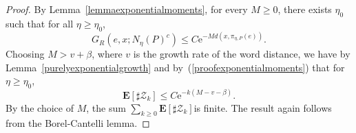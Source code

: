 \documentclass{amsart}
\newcommand{\showcomments}{yes}
\newenvironment{comment}%
{\ifthenelse{\equal{\showcomments}{yes}}%
{\footnotemark
    \begin{lrbox}{\commentbox}
    \begin{minipage}[t]{1.25in}\raggedright\sffamily\upshape\tiny
    \footnotemark[\arabic{footnote}]}%
{\begin{lrbox}{\commentbox}}}%
{\ifthenelse{\equal{\showcomments}{yes}}%
{\end{minipage}\end{lrbox}\marginpar{\usebox{\commentbox}}}%
{\end{lrbox}}}
\theoremstyle{definition}
\newtheorem{defn}[thm]{Definition}
\theoremstyle{remark}
\begin{document}
\begin{proof}
By  Lemma~\ref{lemmaexponentialmoments}, for every $M\geq 0$, there exists $\eta_0$ such that for all $\eta\geq \eta_0$,
$$G_R(e,x;N_\eta(P)^c)\leq C \mathrm{e}^{-Md(x,\pi_{\eta,P}(e))}.$$
Choosing $M>v+\beta$, where $v$ is the growth rate of the word distance, we have by Lemma~\ref{purelyexponentialgrowth} and by~(\ref{proofexponentialmoments})
that for $\eta\geq \eta_0$,
$$\mathbf E[\sharp \mathcal{Z}_k]\leq C\mathrm{e}^{-k(M-v-\beta)}.$$
By the choice of $M$, the sum $\sum_{k\geq 0}\mathbf E[\sharp \mathcal{Z}_k]$is finite.
The result again follows from the Borel-Cantelli lemma.
\end{proof}


\end{document}
